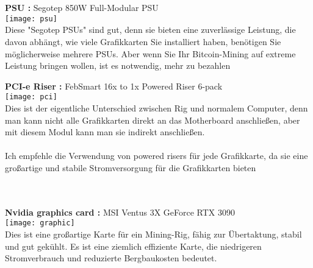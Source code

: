 \documentclass[ngerman]{scrreprt}
\begin{document}
\\ \\
\begin{large}
	\textbf{PSU :} Segotep 850W Full-Modular PSU \\ 
	\texttt{[image: psu]}  \\
	Diese "Segotep PSUs" sind gut, denn sie bieten eine zuverlässige Leistung, die davon abhängt, wie viele Grafikkarten Sie installiert haben, benötigen Sie möglicherweise mehrere PSUs. Aber wenn Sie Ihr Bitcoin-Mining auf extreme Leistung bringen wollen, ist es notwendig, mehr zu bezahlen \\
\end{large}
\newpage
\begin{large}
	\textbf{PCI-e Riser :} FebSmart 16x to 1x Powered Riser 6-pack \\ 
	\texttt{[image: pci]}  \\
	Dies ist der eigentliche Unterschied zwischen Rig und normalem Computer, denn man kann nicht alle Grafikkarten direkt an das Motherboard anschließen, aber mit diesem Modul kann man sie indirekt anschließen.\\ \\
	
	Ich empfehle die Verwendung von powered risers für jede Grafikkarte, da sie eine großartige und stabile Stromversorgung für die Grafikkarten bieten \\ \\ \\
	
	
\end{large}

\begin{large}
	\textbf{Nvidia graphics card :} MSI Ventus 3X GeForce RTX 3090
	 \\ 
	\texttt{[image: graphic]}  \\
	Dies ist eine großartige Karte für ein Mining-Rig, fähig zur Übertaktung, stabil und gut gekühlt. Es ist eine ziemlich effiziente Karte, die niedrigeren Stromverbrauch und reduzierte Bergbaukosten bedeutet. \\ 

	
\end{large}
\newpage
\end{document}
